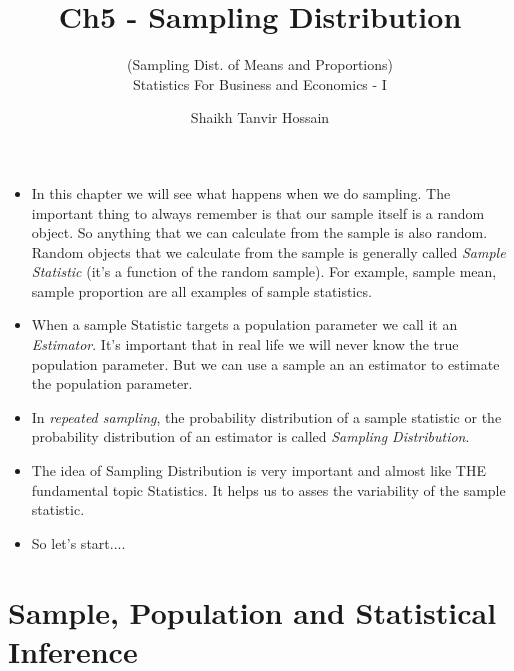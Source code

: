 \documentclass[8pt, usepdftitle=false]{beamer}
\title{\LARGE Ch5 - Sampling Distribution}
\subtitle{{\fontsize{10}{10}\selectfont\color{gray!50!balck} 
(Sampling Dist. of Means and Proportions)} 
\\\vspace*{.2cm} Statistics For Business and Economics - I}
\author{Shaikh Tanvir Hossain\vspace*{-.4cm}}
\institute{ East West University, Dhaka\\ Last Updated \today}
\date{\vspace{-5pt}}
\begin{document}



\begin{frame}[allowframebreaks]{}

\begin{itemize}
\item In this chapter we will see what happens when we do sampling. The important thing to always remember is that our sample itself is a random object. So anything that we can calculate from the sample is also random. Random objects that we calculate from the sample is generally called \emph{Sample Statistic} (it's a function of the random sample). For example, sample mean, sample proportion are all examples of sample statistics. 

\item When a sample Statistic targets a population parameter we call it an \emph{Estimator}. It's important that in real life we will never know the true population parameter. But we can use a sample an an estimator to estimate the population parameter. 


\item In \emph{repeated sampling}, the probability distribution of a sample statistic or the probability distribution of an estimator is called \emph{Sampling Distribution}. 

\item  The idea of Sampling Distribution is very important and almost like THE fundamental topic Statistics. It helps us to asses the variability of the sample statistic. 


\item So let's start...\faWalking \faWalking \faWalking.

\end{itemize}

\end{frame}



\section{Sample, Population and Statistical Inference}
\frame{\sectionpage}




\end{document}
